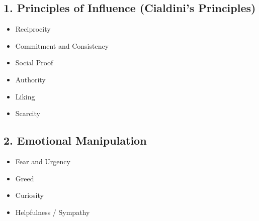 \subsection{1. Principles of Influence (Cialdini's Principles)}
\begin{itemize}
    \item Reciprocity
    \item Commitment and Consistency
    \item Social Proof
    \item Authority
    \item Liking
    \item Scarcity
\end{itemize}

\subsection{2. Emotional Manipulation}
\begin{itemize}
    \item Fear and Urgency
    \item Greed
    \item Curiosity
    \item Helpfulness / Sympathy
\end{itemize}

